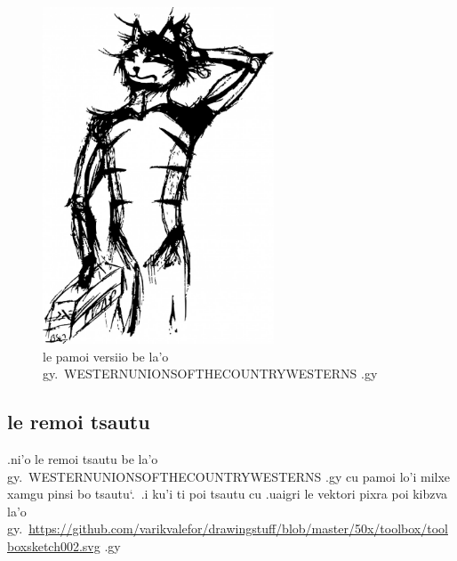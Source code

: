 \documentclass{report}
\newcommand\imageheight{10cm}
\newcommand\sds{\spacefactor\sfcode`.\ \space}
\begin{document}
\begin{figure}[ht]
	\centering
	\includegraphics[height=\imageheight]{50x/toolbox/s1v1.jpg}
	\caption[center]{le pamoi versiio be la'o gy.\ WESTERNUNIONSOFTHECOUNTRYWESTERNS .gy}
\end{figure}
\subsection{le remoi tsautu}
.ni'o le remoi tsautu be la'o gy.\ WESTERNUNIONSOFTHECOUNTRYWESTERNS .gy cu pamoi lo'i milxe xamgu pinsi bo tsautu\sds  .i ku'i ti poi tsautu cu .uaigri le vektori pixra poi kibzva la'o gy.\ \url{https://github.com/varikvalefor/drawingstuff/blob/master/50x/toolbox/toolboxsketch002.svg} .gy
\end{document}
